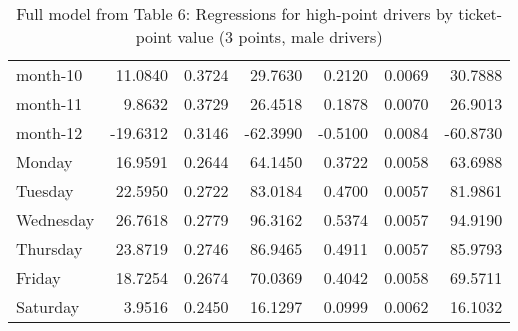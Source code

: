 \documentclass[10pt]{article}
\begin{document}
\begin{table}[ht]
\begin{tabular}{lrrrrrr}
  month-10 & 11.0840 & 0.3724 & 29.7630 & 0.2120 & 0.0069 & 30.7888 \\ 
  month-11 & 9.8632 & 0.3729 & 26.4518 & 0.1878 & 0.0070 & 26.9013 \\ 
  month-12 & -19.6312 & 0.3146 & -62.3990 & -0.5100 & 0.0084 & -60.8730 \\ 
  Monday & 16.9591 & 0.2644 & 64.1450 & 0.3722 & 0.0058 & 63.6988 \\ 
  Tuesday & 22.5950 & 0.2722 & 83.0184 & 0.4700 & 0.0057 & 81.9861 \\ 
  Wednesday & 26.7618 & 0.2779 & 96.3162 & 0.5374 & 0.0057 & 94.9190 \\ 
  Thursday & 23.8719 & 0.2746 & 86.9465 & 0.4911 & 0.0057 & 85.9793 \\ 
  Friday & 18.7254 & 0.2674 & 70.0369 & 0.4042 & 0.0058 & 69.5711 \\ 
  Saturday & 3.9516 & 0.2450 & 16.1297 & 0.0999 & 0.0062 & 16.1032 \\ 
   \hline
\end{tabular}
\caption{Full model from Table 6: Regressions for high-point drivers by ticket-point value (3 points, male drivers)} 
\label{tab_6_3_pts_no_age_M}
\end{table}


\clearpage
\pagebreak



\end{document}
